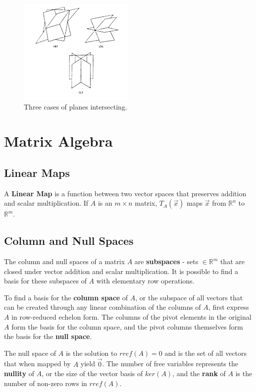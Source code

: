 \documentclass[11pt]{article}
\begin{document}
	\begin{figure}[htb]
		\centering
		\includegraphics[width=0.5\textwidth]{planarint.jpg}
		\caption{Three cases of planes intersecting.}
		\label{fig:planarint}
	\end{figure}
	
\section{Matrix Algebra}
	\subsection{Linear Maps}
		A \textbf{Linear Map} is a function between two vector spaces that preserves addition and scalar multiplication. If $A$ is an $m\times n$ matrix, $T_A(\vec{x})$ maps $\vec{x}$ from $\mathbb{R}^n$ to $\mathbb{R}^m$.
		
	\subsection{Column and Null Spaces}
		The column and null spaces of a matrix $A$ are \textbf{subspaces} - sets $\in \mathbb{R}^m$ that are closed under vector addition and scalar multiplication. It is possible to find a basis for these subspaces of $A$ with elementary row operations.
		
		To find a basis for the \textbf{column space} of $A$, or the subspace of all vectors that can be created through any linear combination of the columns of $A$, first express $A$ in row-reduced echelon form. The columns of the pivot elements in the original $A$ form the basis for the column space, and the pivot columns themselves form the basis for the \textbf{null space}.
		
		The null space of $A$ is the solution to $rref(A) = 0$ and is the set of all vectors that when mapped by $A$ yield $\vec{0}$. The number of free variables represents the \textbf{nullity} of $A$, or the size of the vector basis of $ker(A)$, and the \textbf{rank} of $A$ is the number of non-zero rows in $rref(A)$.
		
\end{document}
